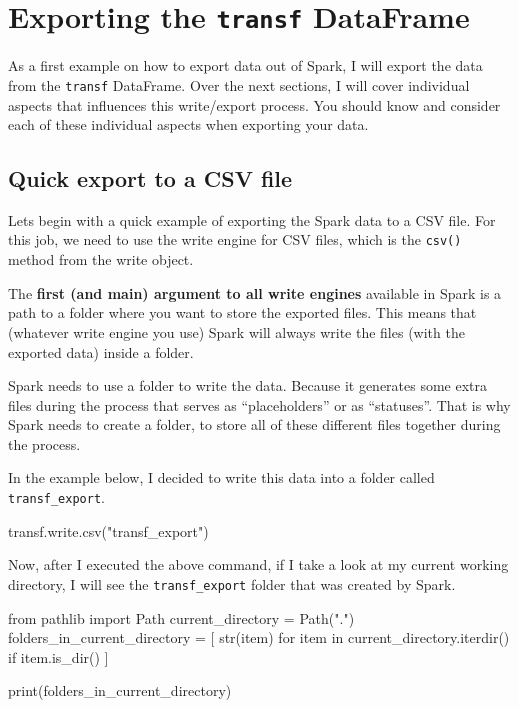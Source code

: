 \documentclass[
  11pt,
  letterpaper,
  DIV=11,
  numbers=noendperiod]{scrreprt}
\newenvironment{Shaded}{\begin{snugshade}}{\end{snugshade}}
\newcommand{\BuiltInTok}[1]{\textcolor[rgb]{0.00,0.23,0.31}{#1}}
\newcommand{\ControlFlowTok}[1]{\textcolor[rgb]{0.00,0.23,0.31}{#1}}
\newcommand{\ImportTok}[1]{\textcolor[rgb]{0.00,0.46,0.62}{#1}}
\newcommand{\KeywordTok}[1]{\textcolor[rgb]{0.00,0.23,0.31}{#1}}
\newcommand{\NormalTok}[1]{\textcolor[rgb]{0.00,0.23,0.31}{#1}}
\newcommand{\OperatorTok}[1]{\textcolor[rgb]{0.37,0.37,0.37}{#1}}
\newcommand{\StringTok}[1]{\textcolor[rgb]{0.13,0.47,0.30}{#1}}
\begin{document}
\section{\texorpdfstring{Exporting the \texttt{transf}
DataFrame}{Exporting the transf DataFrame}}\label{sec-write-example}

As a first example on how to export data out of Spark, I will export the
data from the \texttt{transf} DataFrame. Over the next sections, I will
cover individual aspects that influences this write/export process. You
should know and consider each of these individual aspects when exporting
your data.

\subsection{Quick export to a CSV
file}\label{quick-export-to-a-csv-file}

Lets begin with a quick example of exporting the Spark data to a CSV
file. For this job, we need to use the write engine for CSV files, which
is the \texttt{csv()} method from the write object.

The \textbf{first (and main) argument to all write engines} available in
Spark is a path to a folder where you want to store the exported files.
This means that (whatever write engine you use) Spark will always write
the files (with the exported data) inside a folder.

Spark needs to use a folder to write the data. Because it generates some
extra files during the process that serves as ``placeholders'' or as
``statuses''. That is why Spark needs to create a folder, to store all
of these different files together during the process.

In the example below, I decided to write this data into a folder called
\texttt{transf\_export}.

\begin{Shaded}
\begin{Highlighting}[]
\NormalTok{transf.write.csv(}\StringTok{"transf\_export"}\NormalTok{)}
\end{Highlighting}
\end{Shaded}

Now, after I executed the above command, if I take a look at my current
working directory, I will see the \texttt{transf\_export} folder that
was created by Spark.

\begin{Shaded}
\begin{Highlighting}[]
\ImportTok{from}\NormalTok{ pathlib }\ImportTok{import}\NormalTok{ Path}
\NormalTok{current\_directory }\OperatorTok{=}\NormalTok{ Path(}\StringTok{"."}\NormalTok{)}
\NormalTok{folders\_in\_current\_directory }\OperatorTok{=}\NormalTok{ [}
    \BuiltInTok{str}\NormalTok{(item)}
    \ControlFlowTok{for}\NormalTok{ item }\KeywordTok{in}\NormalTok{ current\_directory.iterdir()}
    \ControlFlowTok{if}\NormalTok{ item.is\_dir()}
\NormalTok{]}

\BuiltInTok{print}\NormalTok{(folders\_in\_current\_directory)}
\end{Highlighting}
\end{Shaded}
\end{document}
